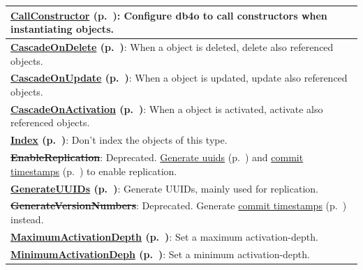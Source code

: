{\small
\begin{longtable}{|p{}|}
\hline
\textbf{\hyperref[ref:configuration-objectclass-call-constructor]{CallConstructor} (p.~\pageref{ref:configuration-objectclass-call-constructor})}: Configure db4o to call constructors when instantiating objects. \\ \hline
\textbf{\hyperref[ref:configuration-objectclass-cascade-on-delete]{CascadeOnDelete} (p.~\pageref{ref:configuration-objectclass-cascade-on-delete})}: When a object is deleted, delete also referenced objects. \\ \hline
\textbf{\hyperref[ref:configuration-objectclass-cascade-on-update]{CascadeOnUpdate} (p.~\pageref{ref:configuration-objectclass-cascade-on-update})}: When a object is updated, update also referenced objects. \\ \hline
\textbf{\hyperref[ref:configuration-objectclass-cascade-on-activate]{CascadeOnActivation} (p.~\pageref{ref:configuration-objectclass-cascade-on-activate})}: When a object is activated, activate also referenced objects. \\ \hline
\textbf{\hyperref[ref:configuration-objectclass-diable-class-index]{Index} (p.~\pageref{ref:configuration-objectclass-diable-class-index})}: Don't index the objects of this type. \\ \hline
\textbf{\sout{EnableReplication}}: Deprecated. \hyperref[ref:configuration-file-generate-uuids]{Generate uuids} (p.~\pageref{ref:configuration-file-generate-uuids}) and \hyperref[ref:configuration-file-generate-timestamps]{commit timestamps} (p.~\pageref{ref:configuration-file-generate-timestamps}) to enable replication. \\ \hline
\textbf{\hyperref[ref:configuration-objectclass-generate-uuid]{GenerateUUIDs} (p.~\pageref{ref:configuration-objectclass-generate-uuid})}: Generate UUIDs, mainly used for replication. \\ \hline
\textbf{\sout{GenerateVersionNumbers}}: Deprecated. Generate \hyperref[ref:configuration-file-generate-timestamps]{commit timestamps} (p.~\pageref{ref:configuration-file-generate-timestamps}) instead. \\ \hline
\textbf{\hyperref[ref:configuration-objectclass-maximum-activation-depth]{MaximumActivationDepth} (p.~\pageref{ref:configuration-objectclass-maximum-activation-depth})}: Set a maximum activation-depth. \\ \hline
\textbf{\hyperref[ref:configuration-objectclass-minimum-activation-depth]{MinimumActivationDeph} (p.~\pageref{ref:configuration-objectclass-minimum-activation-depth})}: Set a minimum activation-depth. \\ \hline

\end{longtable}}
